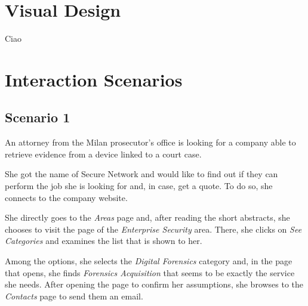 \documentclass[12pt]{report}
\begin{document}
\chapter{Visual Design}
Ciao 
%

\chapter{Interaction Scenarios}

\section{Scenario 1}
An attorney from the Milan prosecutor's office is looking for a company able to retrieve evidence from a device linked to a court case.

She got the name of Secure Network and would like to find out if they can perform the job she is looking for and, in case, get a quote.
To do so, she connects to the company website.

She directly goes to the \emph{Areas} page and, after reading the short abstracts, she chooses to visit the page of the \emph{Enterprise Security} area.
There, she clicks on \emph{See Categories} and examines the list that is shown to her.

Among the options, she selects the \emph{Digital Forensics} category and, in the page that opens, she finds \emph{Forensics Acquisition} that seems to be exactly the service she needs.
After opening the page to confirm her assumptions, she browses to the \emph{Contacts} page to send them an email.
\end{document}
